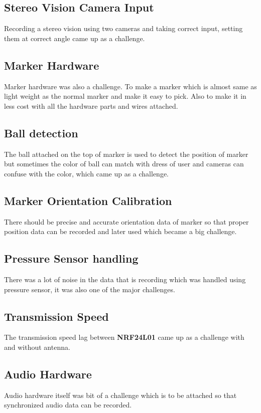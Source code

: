 \subsection{Stereo Vision Camera Input}
Recording a stereo vision using two cameras and taking correct input, setting them at correct angle came up as a challenge.
\bigskip


\subsection{Marker Hardware}
Marker hardware was also a challenge. To make a marker which is almost same as light weight as the normal marker and make it easy to pick. Also to make it in less cost with all the hardware parts and wires attached.
\bigskip


\subsection{Ball detection}
The ball attached on the top of marker is used to detect the position of marker but sometimes the color of ball can match with dress of user and cameras can confuse with the color, which came up as a challenge.
\bigskip

\subsection{Marker Orientation Calibration}
There should be precise and accurate orientation data of marker so that proper position data can be recorded and later used which became a big challenge.
\bigskip

\subsection{Pressure Sensor handling}
There was a lot of noise in the data that is recording which was handled using pressure sensor, it was also one of the major challenges.
\bigskip

\subsection{Transmission Speed}
The transmission speed lag between \textbf{NRF24L01} came up as a challenge with and without antenna.
\bigskip

\subsection{Audio Hardware}
Audio hardware itself was bit of a challenge which is to be attached so that synchronized audio data can be recorded.
\bigskip

